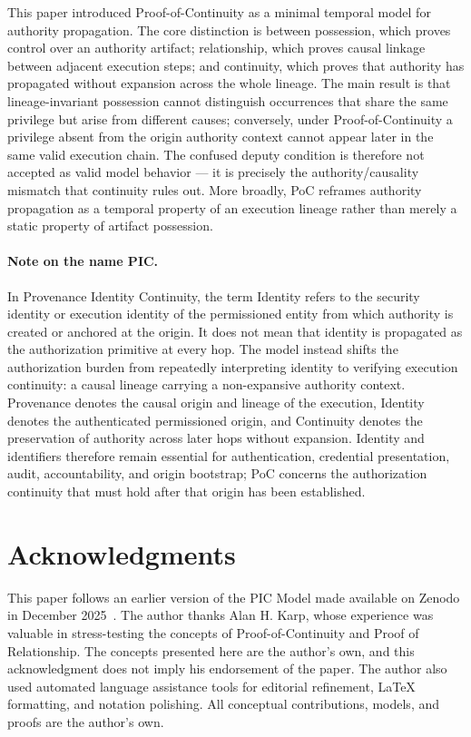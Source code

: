 \documentclass[11pt]{article}
\begin{document}
This paper introduced Proof-of-Continuity as a minimal temporal model for
authority propagation. The core distinction is between possession, which proves
control over an authority artifact; relationship, which proves causal linkage
between adjacent execution steps; and continuity, which proves that authority has
propagated without expansion across the whole lineage. The main result is that
lineage-invariant possession cannot distinguish occurrences that share the same
privilege but arise from different causes; conversely, under Proof-of-Continuity a
privilege absent from the origin authority context cannot appear later in the
same valid execution chain. The confused deputy condition is therefore not
accepted as valid model behavior --- it is precisely the authority/causality
mismatch that continuity rules out. More broadly, PoC reframes authority
propagation as a temporal property of an execution lineage rather than merely a
static property of artifact possession.

\paragraph{Note on the name PIC.}
In Provenance Identity Continuity, the term Identity refers to the security
identity or execution identity of the permissioned entity from which authority is
created or anchored at the origin. It does not mean that identity is propagated
as the authorization primitive at every hop. The model instead shifts the
authorization burden from repeatedly interpreting identity to verifying execution
continuity: a causal lineage carrying a non-expansive authority context.
Provenance denotes the causal origin and lineage of the execution, Identity
denotes the authenticated permissioned origin, and Continuity denotes the
preservation of authority across later hops without expansion. Identity and
identifiers therefore remain essential for authentication, credential
presentation, audit, accountability, and origin bootstrap; PoC concerns the
authorization continuity that must hold after that origin has been established.

\section*{Acknowledgments}

This paper follows an earlier version of the PIC Model made available on
Zenodo in December 2025~\cite{gallo2025pic}. The author thanks Alan H. Karp,
whose experience was valuable in stress-testing the concepts of
Proof-of-Continuity and Proof of Relationship. The concepts presented here are
the author's own, and this acknowledgment does not imply his endorsement of the
paper. The author also used automated language assistance tools for editorial
refinement, LaTeX formatting, and notation polishing. All conceptual
contributions, models, and proofs are the author's own.
\end{document}
